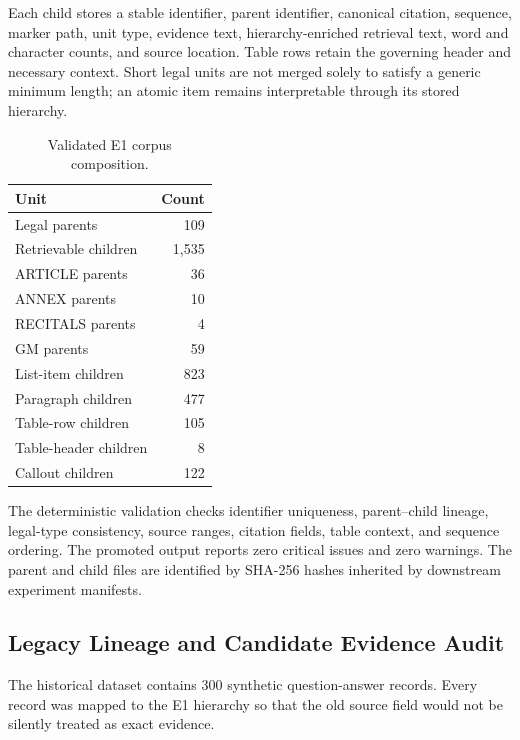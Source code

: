 Each child stores a stable identifier, parent identifier, canonical citation, sequence, marker path, unit type, evidence text, hierarchy-enriched retrieval text, word and character counts, and source location. Table rows retain the governing header and necessary context. Short legal units are not merged solely to satisfy a generic minimum length; an atomic item remains interpretable through its stored hierarchy.

\begin{table}[htbp]
  \centering
  \caption{Validated E1 corpus composition.}
  \label{tab:e1-corpus}
  \begin{tabular}{lr}
    \toprule
    \textbf{Unit} & \textbf{Count} \\
    \midrule
    Legal parents & 109 \\
    Retrievable children & 1,535 \\
    ARTICLE parents & 36 \\
    ANNEX parents & 10 \\
    RECITALS parents & 4 \\
    GM parents & 59 \\
    \midrule
    List-item children & 823 \\
    Paragraph children & 477 \\
    Table-row children & 105 \\
    Table-header children & 8 \\
    Callout children & 122 \\
    \bottomrule
  \end{tabular}
\end{table}

The deterministic validation checks identifier uniqueness, parent--child lineage, legal-type consistency, source ranges, citation fields, table context, and sequence ordering. The promoted output reports zero critical issues and zero warnings. The parent and child files are identified by SHA-256 hashes inherited by downstream experiment manifests.

\subsection{Legacy Lineage and Candidate Evidence Audit}

The historical dataset contains 300 synthetic question-answer records. Every record was mapped to the E1 hierarchy so that the old source field would not be silently treated as exact evidence.

